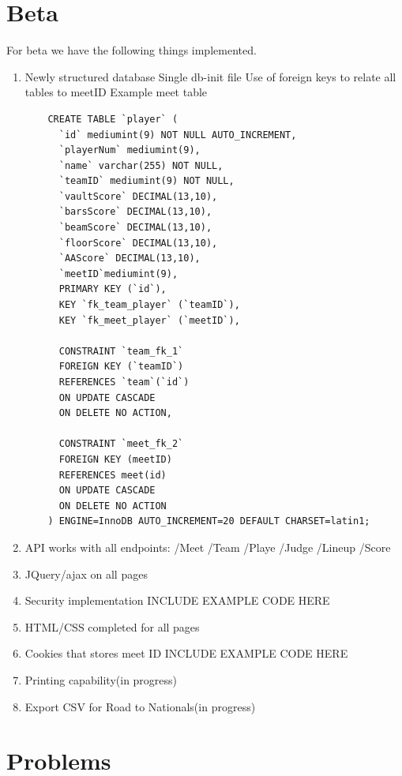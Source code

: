 \documentclass[letterpaper,10pt,draftclsnofoot,onecolumn,]{article}
\begin{document}
\section{Beta}
For beta we have the following things implemented.
\begin{enumerate}
    \item Newly structured database
    \subitem Single db-init file
    \subitem Use of foreign keys to relate all tables to meetID
    \subitem Example meet table
    \begin{verbatim}
    CREATE TABLE `player` (
      `id` mediumint(9) NOT NULL AUTO_INCREMENT,
      `playerNum` mediumint(9),
      `name` varchar(255) NOT NULL,
      `teamID` mediumint(9) NOT NULL,
      `vaultScore` DECIMAL(13,10),
      `barsScore` DECIMAL(13,10),
      `beamScore` DECIMAL(13,10),
      `floorScore` DECIMAL(13,10),
      `AAScore` DECIMAL(13,10),
      `meetID`mediumint(9),
      PRIMARY KEY (`id`),
      KEY `fk_team_player` (`teamID`),
      KEY `fk_meet_player` (`meetID`),
    
      CONSTRAINT `team_fk_1`
      FOREIGN KEY (`teamID`)
      REFERENCES `team`(`id`)
      ON UPDATE CASCADE
      ON DELETE NO ACTION,
    
      CONSTRAINT `meet_fk_2`
      FOREIGN KEY (meetID)
      REFERENCES meet(id)
      ON UPDATE CASCADE
      ON DELETE NO ACTION
    ) ENGINE=InnoDB AUTO_INCREMENT=20 DEFAULT CHARSET=latin1;
    \end{verbatim}
    \item API works with all endpoints:
        \subitem /Meet  
        \subitem /Team  
        \subitem /Playe    
        \subitem /Judge
        \subitem /Lineup   
        \subitem /Score     
    \item JQuery/ajax on all pages
    \item Security implementation
        \subitem INCLUDE EXAMPLE CODE HERE
    \item HTML/CSS completed for all pages
    \item Cookies that stores meet ID
        \subitem INCLUDE EXAMPLE CODE HERE
    \item Printing capability(in progress)
    \item Export CSV for Road to Nationals(in progress)
\end{enumerate}
\section{Problems}
\end{document}
